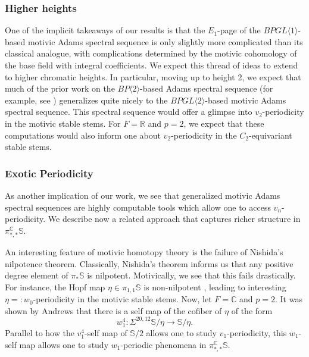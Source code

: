 \documentclass{amsart}
\theoremstyle{plain}
\numberwithin{theorem}{section}
\numberwithin{equation}{section}
\numberwithin{figure}{section}
\newcommand{\0}{\langle 0 \rangle }
\begin{document}
\subsubsection{Higher heights}
One of the implicit takeaways of our results is that the $E_1$-page of the $BPGL\langle 1 \rangle$-based motivic Adams spectral sequence is only slightly more complicated than its classical analogue, with complications determined by the motivic cohomology of the base field with integral coefficients. We expect this thread of ideas to extend to higher chromatic heights. In particular, moving up to height 2, we expect that much of the prior work on the $BP \langle 2 \rangle$-based Adams spectral sequence (for example, see \cite{culver-bp2coop,CulverOddp20}) generalizes quite nicely to the $BPGL \langle 2 \rangle$-based motivic Adams spectral sequence. This spectral sequence would offer a glimpse into $v_2$-periodicity in the motivic stable stems. For $F=\mathbb{R}$ and $p=2$, we expect that these computations would also inform one about $v_2$-periodicity in the $C_2$-equivariant stable stems.

\subsubsection{Exotic Periodicity}
As another implication of our work, we see that generalized motivic Adams spectral sequences are highly computable tools which allow one to access $v_n$-periodicity. We describe now a related approach that captures richer structure in $\pi_{*,*}^\mathbb{C}\mathbb{S}$.

An interesting feature of motivic homotopy theory is the failure of Nishida's nilpotence theorem. Classically, Nishida's theorem informs us that any positive degree element of $\pi_*\mathbb{S}$ is nilpotent. Motivically, we see that this fails drastically. For instance, the Hopf map $\eta \in \pi_{1,1}\mathbb{S}$ is non-nilpotent \cite{MorelKMW}, leading to interesting $\eta=:w_0$-periodicity in the motivic stable stems. Now, let $F=\mathbb{C}$ and $p=2$. It was shown by Andrews \cite{Andrews18} that there is a self map of the cofiber of $\eta$ of the form
\[w_1^4:\Sigma^{20,12}\mathbb{S}/\eta \to \mathbb{S}/\eta.\]
Parallel to how the $v_1^4$-self map of $\mathbb{S}/2$ allows one to study $v_1$-periodicity, this $w_1$-self map allows one to study $w_1$-periodic phenomena in $\pi^\mathbb{C}_{*,*}\mathbb{S}$.
\end{document}
